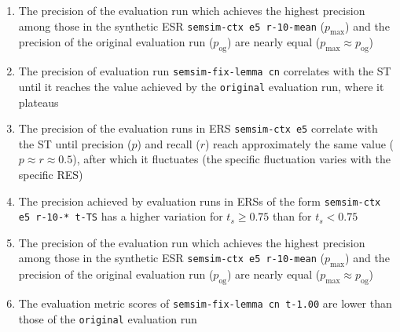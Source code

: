 \documentclass[11pt]{scrreprt}
\newcounter{listcounter}
\begin{document}
\begin{enumerate}[label=\arabic{listcounter}.\arabic*]
	\item The precision of the evaluation run which achieves the highest precision among those in the synthetic ESR \texttt{semsim-ctx e5 r-10-mean} (\(p_\text{max}\)) and the precision of the original evaluation run (\(p_\text{og}\)) are nearly equal (\(p_\text{max} \approx p_\text{og}\)) \label{obs-itm:CNESS-highest-precision-equal-original} 	
	\item The precision of evaluation run \texttt{semsim-fix-lemma cn}  correlates with the ST until it reaches the value achieved by the \texttt{original} evaluation run, where it plateaus \label{obs-itm:FNESS-ST-precision-correlates}
	\item The precision of the evaluation runs in ERS \texttt{semsim-ctx e5} correlate with the ST until precision (\(p\)) and recall (\(r\)) reach approximately the same value (\(p \approx r \approx 0.5\)), after which it fluctuates (the specific fluctuation varies with the specific RES) \label{obs-itm:CNESS-ST-precision-correlates-until-crosspoint}

	\item The precision achieved by evaluation runs in ERSs of the form \texttt{semsim-ctx e5 r-10-* t-TS} has a higher variation for \(t_s \geq 0.75\) than for \(t_s < 0.75\) \label{obs-itm:CNESS-precision-variation-higher-ASTR}
	\item The precision of the evaluation run which achieves the highest precision among those in the synthetic ESR \texttt{semsim-ctx e5 r-10-mean} (\(p_\text{max}\)) and the precision of the original evaluation run (\(p_\text{og}\)) are nearly equal (\(p_\text{max} \approx p_\text{og}\)) \label{obs-itm:CNESS-highest-precision-equal-original} 	
	\item The evaluation metric scores of \texttt{semsim-fix-lemma cn t-1.00} are lower than those of the \texttt{original} evaluation run \label{obs-itm:FNESS-ST-limit}


\end{enumerate}
 
 
 
 
\end{document}
